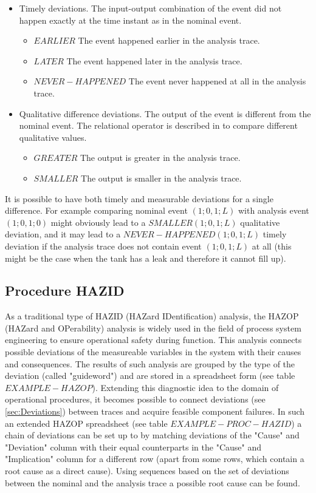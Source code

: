 \documentclass[conference]{IEEEtran}
\begin{document}
\begin{itemize}
\item Timely deviations. The input-output combination of the event did not happen exactly at the time instant as in the nominal event. 
	\begin{itemize}
	  \item $EARLIER$ The event happened earlier in the analysis trace.
	  \item $LATER$ The event happened later in the analysis trace.
	  \item $NEVER-HAPPENED$ The event never happened at all in the analysis trace.
	\end{itemize}
\item Qualitative difference deviations. The output of the event is different from the nominal event. The relational operator is described in \cite{QUALCAL} to compare different qualitative values.
	\begin{itemize}
	  \item $GREATER$ The output is greater in the analysis trace.
	  \item $SMALLER$ The output is smaller in the analysis trace.
	\end{itemize}
\end{itemize}

It is possible to have both timely and measurable deviations for a single difference. For example comparing nominal event $(1;0,1;L)$ with analysis event $(1;0,1;0)$ might obviously lead to a $SMALLER(1;0,1;L)$ qualitative deviation, and it may lead to a $NEVER-HAPPENED(1;0,1;L)$ timely deviation if the analysis trace does not contain event $(1;0,1;L)$ at all (this might be the case when the tank has a leak and therefore it cannot fill up).

\subsection{Procedure HAZID}

As a traditional type of HAZID (HAZard IDentification) analysis, the HAZOP (HAZard and OPerability) analysis is widely used in the field of process system engineering to ensure operational safety during function. This analysis connects possible deviations of the measureable variables in the system with their causes and consequences. The results of such analysis are grouped by the type of the deviation (called "guideword") and are stored in a spreadsheet form (see table $EXAMPLE-HAZOP$). Extending this diagnostic idea to the domain of operational procedures, it becomes possible to connect deviations (see \ref{sec:Deviations}) between traces and acquire feasible component failures. In such an extended HAZOP spreadsheet (see table $EXAMPLE-PROC-HAZID$) a chain of deviations can be set up to by matching deviations of the "Cause" and "Deviation" column with their equal counterparts in the "Cause" and "Implication" column for a different row (apart from some rows, which contain a root cause as a direct cause). Using sequences based on the set of deviations between the nominal and the analysis trace a possible root cause can be found. 
\end{document}
